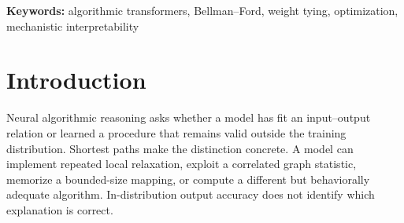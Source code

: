 \documentclass[10pt,twocolumn]{article}
\begin{document}
\maketitle
\vspace{-1.2em}

\begin{abstract}
\noindent
Hand-constructed transformers provide unusually strong ground truth: their
forward pass, intermediate state, and intended circuit are known exactly.
This does not imply that gradient descent can recover the same computation,
even when the constructed solution belongs to the trainable model's
hypothesis class. We study this prerequisite using a weight-tied transformer
whose forward pass executes Bellman--Ford relaxation. The construction is not
our novelty; its useful properties are exact verification, complete per-round
state, and exact embedding into a trainable twin. On directed graphs with at
most four nodes, a widened, LayerNorm-free, weight-tied model trained from
random initialization reaches 96.97\% held-out graph exactness, 98.85\% node
exactness, and 96.97\% exactness on reachable non-source nodes. The embedded
construction attains 100\% exactness, zero objective, and zero gradient, yet
the learned endpoint remains approximately as far from the constructed
parameters as initialization. A matched short run is still improving at
50.20\% graph exactness, while an 80,000-step run saturates near 97\%.
Perturbation experiments support optimizer-step drift rather than an
objective that rewards loss of exactness. These are single-seed,
small-graph diagnostics. We do not run the tied-versus-untied experiment
needed to determine whether recurrence causes learned relaxation.
\end{abstract}

\vspace{0.3em}
\noindent\textbf{Keywords:} algorithmic transformers, Bellman--Ford,
weight tying, optimization, mechanistic interpretability

\section{Introduction}

Neural algorithmic reasoning asks whether a model has fit an input--output
relation or learned a procedure that remains valid outside the training
distribution. Shortest paths make the distinction concrete. A model can
implement repeated local relaxation, exploit a correlated graph statistic,
memorize a bounded-size mapping, or compute a different but behaviorally
adequate algorithm. In-distribution output accuracy does not identify which
explanation is correct.
\end{document}
